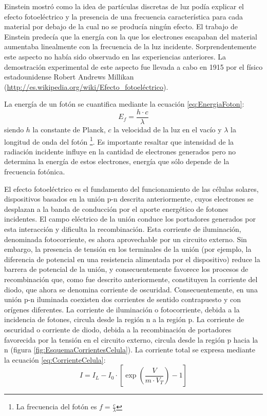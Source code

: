 Einstein mostró como la idea de partículas discretas de luz podía
explicar el efecto fotoeléctrico y la presencia de una frecuencia
característica para cada material por debajo de la cual no se producía
ningún efecto. El trabajo de Einstein predecía que la energía con
la que los electrones escapaban del material aumentaba linealmente
con la frecuencia de la luz incidente. Sorprendentemente este aspecto
no había sido observado en las experiencias anteriores. La demostración
experimental de este aspecto fue llevada a cabo en 1915 por el físico
estadounidense Robert Andrews Millikan (\url{http://es.wikipedia.org/wiki/Efecto_fotoeléctrico}). 

La energía de un fotón se cuantifica mediante la ecuación \ref{eq:EnergiaFoton}:\begin{equation}
E_{f}=\frac{h\cdot c}{\lambda}\label{eq:EnergiaFoton}\end{equation}
siendo $h$ la constante
de Planck, $c$ la velocidad de la luz en el vacío y $\lambda$
la longitud de onda del fotón%
\footnote{La frecuencia del fotón es $f=\frac{c}{\lambda}$%
}. Es importante resaltar que intensidad de la radiación incidente
influye en la cantidad de electrones generados pero no determina la
energía de estos electrones, energía que sólo depende de la frecuencia
fotónica. 

El efecto fotoeléctrico es el fundamento del funcionamiento de las
células solares, dispositivos basados en la unión p-n descrita anteriormente,
cuyos electrones se desplazan a la banda de conducción por el aporte
energético de fotones incidentes. El campo eléctrico de la unión conduce
los portadores generados por esta interacción y dificulta la recombinación.
Esta corriente de iluminación, denominada fotocorriente, es ahora
aprovechable por un circuito externo. Sin embargo, la presencia de
tensión en los terminales de la unión (por ejemplo, la diferencia
de potencial en una resistencia alimentada por el dispositivo) reduce
la barrera de potencial de la unión, y consecuentemente favorece los
procesos de recombinación que, como fue descrito anteriormente, constituyen
la corriente del diodo, que ahora se denomina corriente de oscuridad.
Consecuentemente, en una unión p-n iluminada coexisten dos corrientes
de sentido contrapuesto y con orígenes diferentes. La corriente de
iluminación o fotocorriente, debida a la incidencia de fotones, circula
desde la región n a la región p. La corriente de oscuridad o corriente
de diodo, debida a la recombinación de portadores favorecida por la
tensión en el circuito externo, circula desde la región p hacia la
n (figura \ref{fig:EsquemaCorrientesCelula}). La corriente total
se expresa mediante la ecuación \ref{eq:CorrienteCelula}: \begin{equation}
I=I_{L}-I_{0}\cdot[\exp(\frac{V}{m\cdot V_{T}})-1]\label{eq:CorrienteCelula}\end{equation}


